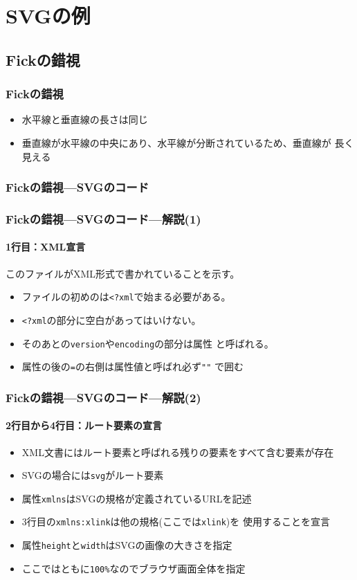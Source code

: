 \section{SVGの例}
\subsection{Fickの錯視}
\begin{frame}[containsverbatim]
 \frametitle{Fickの錯視}
 \begin{itemize}
  \item 水平線と垂直線の長さは同じ
  \item 垂直線が水平線の中央にあり、水平線が分断されているため、垂直線が
        長く見える
 \end{itemize}
\end{frame}
\begin{frame}[containsverbatim]
 \frametitle{Fickの錯視---SVGのコード}
\end{frame}
\begin{frame}[containsverbatim]
 \frametitle{Fickの錯視---SVGのコード---解説(1)}
 \framesubtitle{1行目：XML宣言}
 このファイルがXML形式で書かれていることを示す。
 \begin{itemize}
  \item ファイルの初めのは\texttt{<?xml}で始まる必要がある。
  \item \texttt{<?xml}の部分に空白があってはいけない。
  \item そのあとの\texttt{version}や\texttt{encoding}の部分は属性
        と呼ばれる。
  \item 属性の後の\texttt{=}の右側は属性値と呼ばれ必ず\texttt{""}
       で囲む
 \end{itemize}
\end{frame}
\begin{frame}[containsverbatim]
\frametitle{Fickの錯視---SVGのコード---解説(2)}
 \framesubtitle{2行目から4行目：ルート要素の宣言}
 \begin{itemize}
  \item XML文書にはルート要素と呼ばれる残りの要素をすべて含む要素が存在
  \item SVGの場合には\texttt{svg}がルート要素
  \item 属性\texttt{xmlns}はSVGの規格が定義されているURLを記述
  \item 3行目の\texttt{xmlns:xlink}は他の規格(ここでは\texttt{xlink})を
        使用することを宣言
  \item 属性\texttt{height}と\texttt{width}はSVGの画像の大きさを指定
  \item ここではともに\texttt{100\%}なのでブラウザ画面全体を指定
 \end{itemize}
\end{frame}
